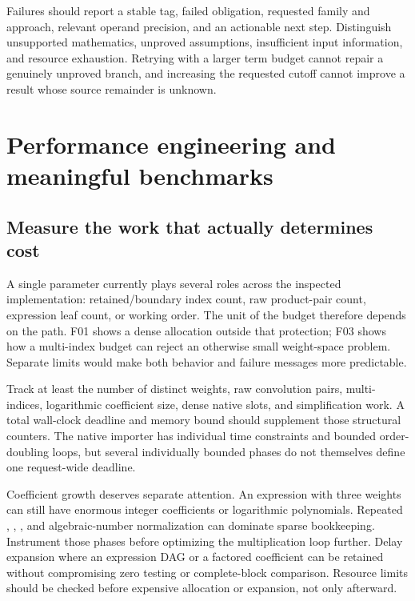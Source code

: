 \documentclass[11pt,a4paper]{article}
\newcommand{\code}[1]{\texttt{\detokenize{#1}}}
\begin{document}
Failures should report a stable tag, failed obligation, requested family and approach, relevant operand precision, and an actionable next step. Distinguish unsupported mathematics, unproved assumptions, insufficient input information, and resource exhaustion. Retrying with a larger term budget cannot repair a genuinely unproved branch, and increasing the requested cutoff cannot improve a result whose source remainder is unknown.

\section{Performance engineering and meaningful benchmarks}\label{sec:performance}

\subsection{Measure the work that actually determines cost}

A single \code{"MaxTerms"} parameter currently plays several roles across the inspected implementation: retained/boundary index count, raw product-pair count, expression leaf count, or working order. The unit of the budget therefore depends on the path. F01 shows a dense allocation outside that protection; F03 shows how a multi-index budget can reject an otherwise small weight-space problem. Separate limits would make both behavior and failure messages more predictable.\cite{core,incremental,native,gamma}

Track at least the number of distinct weights, raw convolution pairs, multi-indices, logarithmic coefficient size, dense native slots, and simplification work. A total wall-clock deadline and memory bound should supplement those structural counters. The native importer has individual time constraints and bounded order-doubling loops, but several individually bounded phases do not themselves define one request-wide deadline.\cite{native}

Coefficient growth deserves separate attention. An expression with three weights can still have enormous integer coefficients or logarithmic polynomials. Repeated \code{Expand}, \code{Together}, \code{Simplify}, and algebraic-number normalization can dominate sparse bookkeeping. Instrument those phases before optimizing the multiplication loop further. Delay expansion where an expression DAG or a factored coefficient can be retained without compromising zero testing or complete-block comparison. Resource limits should be checked before expensive allocation or expansion, not only afterward.
\end{document}
